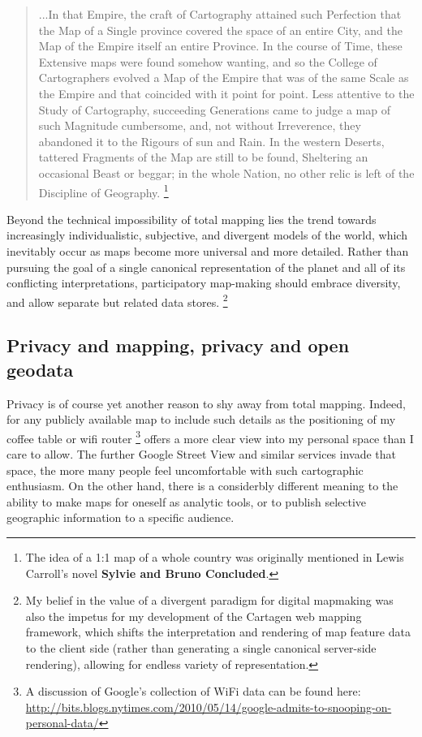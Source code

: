 \documentclass[11pt]{report}
\begin{document}
\begin{quote}
...In that Empire, the craft of Cartography attained such Perfection that the Map of a Single province covered the space of an entire City, and the Map of the Empire itself an entire Province. In the course of Time, these Extensive maps were found somehow wanting, and so the College of Cartographers evolved a Map of the Empire that was of the same Scale as the Empire and that coincided with it point for point. Less attentive to the Study of Cartography, succeeding Generations came to judge a map of such Magnitude cumbersome, and, not without Irreverence, they abandoned it to the Rigours of sun and Rain. In the western Deserts, tattered Fragments of the Map are still to be found, Sheltering an occasional Beast or beggar; in the whole Nation, no other relic is left of the Discipline of Geography.
\cite{borges1946exactitude} \footnote{The idea of a 1:1 map of a whole country was originally mentioned in Lewis Carroll's novel \textbf{Sylvie and Bruno Concluded}.} 
\end{quote}

Beyond the technical impossibility of total mapping lies the trend towards increasingly individualistic, subjective, and divergent models of the world, which inevitably occur as maps become more universal and more detailed. Rather than pursuing the goal of a single canonical representation of the planet and all of its conflicting interpretations, participatory map-making should embrace diversity, and allow separate but related data stores. \footnote{My belief in the value of a divergent paradigm for digital mapmaking was also the impetus for my development of the Cartagen web mapping framework, which shifts the interpretation and rendering of map feature data to the client side (rather than generating a single canonical server-side rendering), allowing for endless variety of representation.} 

\subsection{Privacy and mapping, privacy and open geodata}

Privacy is of course yet another reason to shy away from total mapping. Indeed, for any publicly available map to include such details as the positioning of my coffee table or wifi router \footnote{A discussion of Google's collection of WiFi data can be found here: \url{http://bits.blogs.nytimes.com/2010/05/14/google-admits-to-snooping-on-personal-data/}} offers a more clear view into my personal space than I care to allow. The further Google Street View and similar services invade that space, the more many people feel uncomfortable with such cartographic enthusiasm. On the other hand, there is a considerbly different meaning to the ability to make maps for oneself as analytic tools, or to publish selective geographic information to a specific audience.  
\end{document}
